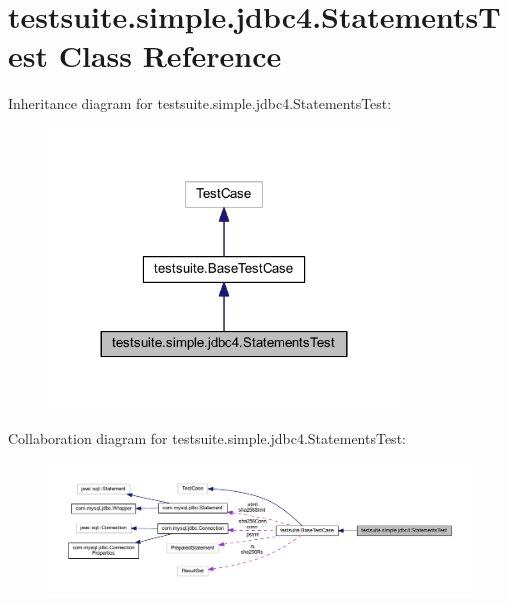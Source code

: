 \hypertarget{classtestsuite_1_1simple_1_1jdbc4_1_1_statements_test}{}\section{testsuite.\+simple.\+jdbc4.\+Statements\+Test Class Reference}
\label{classtestsuite_1_1simple_1_1jdbc4_1_1_statements_test}


Inheritance diagram for testsuite.\+simple.\+jdbc4.\+Statements\+Test\+:
\nopagebreak
\begin{figure}[H]
\begin{center}
\leavevmode
\includegraphics[width=264pt]{classtestsuite_1_1simple_1_1jdbc4_1_1_statements_test__inherit__graph}
\end{center}
\end{figure}


Collaboration diagram for testsuite.\+simple.\+jdbc4.\+Statements\+Test\+:
\nopagebreak
\begin{figure}[H]
\begin{center}
\leavevmode
\includegraphics[width=350pt]{classtestsuite_1_1simple_1_1jdbc4_1_1_statements_test__coll__graph}
\end{center}
\end{figure}
